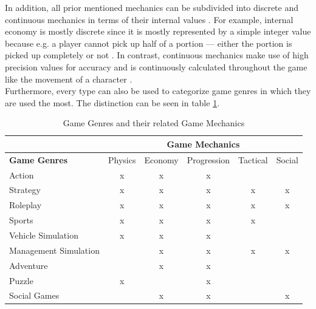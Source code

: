 \documentclass[MGS,Master,english]{twbook}%
\begin{document}
In addition, all prior mentioned mechanics can be subdivided into discrete and continuous mechanics in terms of their internal values \cite{gameDesign::gameMechanicsAdvancedGameDesign}. For example, internal economy is mostly discrete since it is mostly represented by a simple integer value because e.g. a player cannot pick up half of a portion — either the portion is picked up completely or not \cite{gameDesign::gameMechanicsAdvancedGameDesign}. In contrast, continuous mechanics make use of high precision values for accuracy and is continuously calculated throughout the game like the movement of a character \cite{gameDesign::gameMechanicsAdvancedGameDesign}. \\
Furthermore, every type can also be used to categorize game genres in which they are used the most. The distinction can be seen in table \ref{GameMechanicsToGenre}.
\begin{table}[!htbp]
	\centering
	\resizebox{\textwidth}{!}
	{%
		\begin{tabular}{l||c|c|c|c|c|}
			\cline{2-6}
			& \multicolumn{5}{c|}{\textbf{Game Mechanics}}        \\ \hline 
			\multicolumn{1}{|l||}{\textbf{Game Genres}}  & Physics & Economy & Progression & Tactical & Social \\ \hline \hline
			\multicolumn{1}{|l||}{Action}                & x       & x       & x           &          &        \\ \hline
			\multicolumn{1}{|l||}{Strategy}              & x       & x       & x           & x        & x      \\ \hline
			\multicolumn{1}{|l||}{Roleplay}              & x       & x       & x           & x        & x      \\ \hline
			\multicolumn{1}{|l||}{Sports}                & x       & x       & x           & x        &        \\ \hline
			\multicolumn{1}{|l||}{Vehicle Simulation}    & x       & x       & x           &          &        \\ \hline
			\multicolumn{1}{|l||}{Management Simulation} &         & x       & x           & x        & x      \\ \hline
			\multicolumn{1}{|l||}{Adventure}             &         & x       & x           &          &        \\ \hline
			\multicolumn{1}{|l||}{Puzzle}                & x       &         & x           &          &        \\ \hline
			\multicolumn{1}{|l||}{Social Games}          &         & x       & x           &          & x      \\ \hline
		\end{tabular}%
	}
	\caption{Game Genres and their related Game Mechanics \protect\cite{gameDesign::gameMechanicsAdvancedGameDesign}}
	\label{GameMechanicsToGenre}
\end{table}\\
\end{document}
